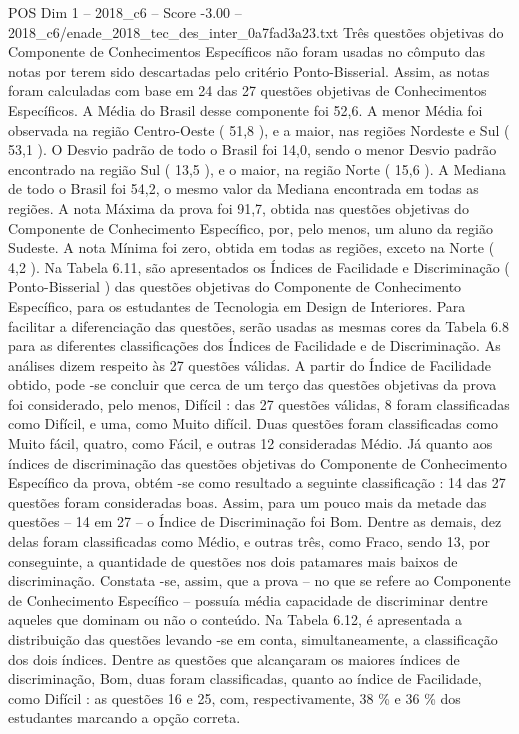 \begin{textsample}{POS Dim 1 – 2018\_c6 – Score -3.00 – 2018\_c6/enade\_2018\_tec\_des\_inter\_0a7fad3a23.txt}
Três questões objetivas do Componente de Conhecimentos Específicos não foram usadas no cômputo das notas por terem sido descartadas pelo critério Ponto-Bisserial.
Assim, as notas foram calculadas com base em 24 das 27 questões objetivas de Conhecimentos Específicos.
A Média do Brasil desse componente foi 52,6.
A menor Média foi observada na região Centro-Oeste ( 51,8 ), e a maior, nas regiões Nordeste e Sul ( 53,1 ).
O Desvio padrão de todo o Brasil foi 14,0, sendo o menor Desvio padrão encontrado na região Sul ( 13,5 ), e o maior, na região Norte ( 15,6 ).
A Mediana de todo o Brasil foi 54,2, o mesmo valor da Mediana encontrada em todas as regiões.
A nota Máxima da prova foi 91,7, obtida nas questões objetivas do Componente de Conhecimento Específico, por, pelo menos, um aluno da região Sudeste.
A nota Mínima foi zero, obtida em todas as regiões, exceto na Norte ( 4,2 ).
Na Tabela 6.11, são apresentados os Índices de Facilidade e Discriminação ( Ponto-Bisserial ) das questões objetivas do Componente de Conhecimento Específico, para os estudantes de Tecnologia em Design de Interiores.
Para facilitar a diferenciação das questões, serão usadas as mesmas cores da Tabela 6.8 para as diferentes classificações dos Índices de Facilidade e de Discriminação.
As análises dizem respeito às 27 questões válidas.
A partir do Índice de Facilidade obtido, pode -se concluir que cerca de um terço das questões objetivas da prova foi considerado, pelo menos, Difícil : das 27 questões válidas, 8 foram classificadas como Difícil, e uma, como Muito difícil.
Duas questões foram classificadas como Muito fácil, quatro, como Fácil, e outras 12 consideradas Médio.
Já quanto aos índices de discriminação das questões objetivas do Componente de Conhecimento Específico da prova, obtém -se como resultado a seguinte classificação : 14 das 27 questões foram consideradas boas.
Assim, para um pouco mais da metade das questões – 14 em 27 – o Índice de Discriminação foi Bom.
Dentre as demais, dez delas foram classificadas como Médio, e outras três, como Fraco, sendo 13, por conseguinte, a quantidade de questões nos dois patamares mais baixos de discriminação.
Constata -se, assim, que a prova – no que se refere ao Componente de Conhecimento Específico – possuía média capacidade de discriminar dentre aqueles que dominam ou não o conteúdo.
Na Tabela 6.12, é apresentada a distribuição das questões levando -se em conta, simultaneamente, a classificação dos dois índices.
Dentre as questões que alcançaram os maiores índices de discriminação, Bom, duas foram classificadas, quanto ao índice de Facilidade, como Difícil : as questões 16 e 25, com, respectivamente, 38 \% e 36 \% dos estudantes marcando a opção correta.

\end{textsample}
